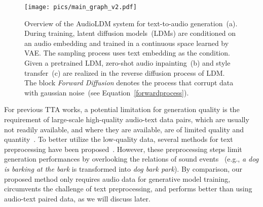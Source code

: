 \documentclass{article}
\begin{document}
\begin{figure*}
    \centerline{
    \texttt{[image: pics/main\_graph\_v2.pdf]}}
    \caption{Overview of the AudioLDM system for text-to-audio generation~(a). During training, latent diffusion models~(LDMs) are conditioned on an audio embedding  and trained in a continuous space  learned by VAE. The sampling process uses text embedding  as the condition. Given a pretrained LDM, zero-shot audio inpainting~(b) and style transfer~(c) are realized in the reverse diffusion process of LDM. The block \textit{Forward Diffusion} denotes the process that corrupt data with gaussian noise~(see Equation~\ref{forwardprocess}).}
    \label{fig:overalldesign}
\end{figure*}

For previous TTA works, a potential limitation for generation quality is the requirement of large-scale high-quality audio-text data pairs, which are usually not readily available, and where they are available, are  
of limited quality and quantity~\cite{liu2022separate}. To better utilize the low-quality data, several methods for text preprocessing have been proposed~\cite{kreuk2022audiogen, yang2022diffsound}. However, these preprocessing steps limit generation performances by overlooking the relations of sound events~
(e.g., \textit{a dog is barking at the bark} is transformed into \textit{dog bark park}).
By comparison, our proposed method only requires audio data for generative model training, circumvents the challenge of text preprocessing, and performs better than using audio-text paired data, as we will discuss later.  
\end{document}

